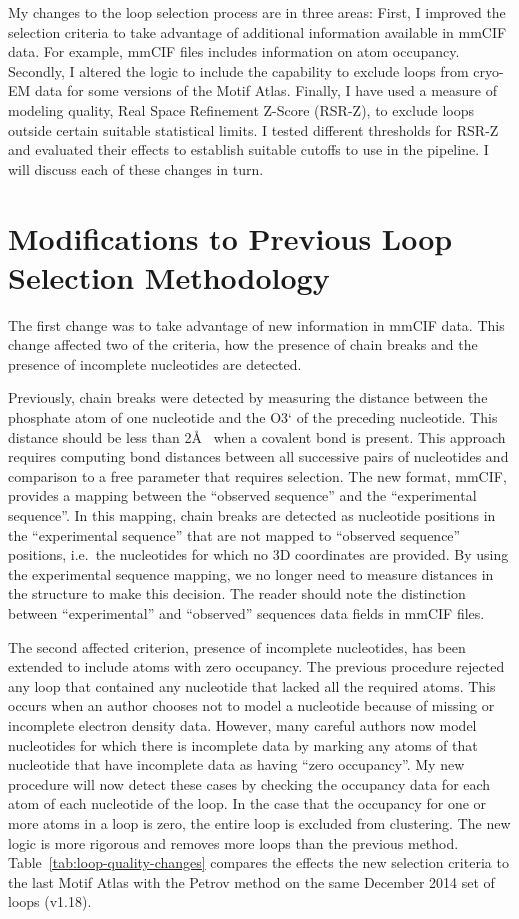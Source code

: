 My changes to the loop selection process are in three areas: First, I improved
the selection criteria to take advantage of additional information available in
mmCIF data. For example, mmCIF files includes information on atom occupancy.
Secondly, I altered the logic to include the capability to exclude loops from
cryo-EM data for some versions of the Motif Atlas. Finally, I have used a
measure of modeling quality, Real Space Refinement Z-Score (RSR-Z), to exclude
loops outside certain suitable statistical limits. I tested different thresholds for
RSR-Z and evaluated their effects to establish suitable cutoffs to use in the
pipeline. I will discuss each of these changes in turn.

\section{Modifications to Previous Loop Selection Methodology}

The first change was to take advantage of new information in mmCIF data. This
change affected two of the criteria, how the presence of chain breaks and
the presence of incomplete nucleotides are detected.

Previously, chain breaks were detected by measuring the distance between the
phosphate atom of one nucleotide and the O3` of the preceding nucleotide. This
distance should be less than 2{\AA}~\cite{Petrov2012} when a covalent bond is
present. This approach requires computing bond distances between all successive
pairs of nucleotides and comparison to a free parameter that requires selection.
The new format, mmCIF, provides a mapping between the ``observed sequence'' and
the ``experimental sequence''. In this mapping, chain breaks are detected as
nucleotide positions in the ``experimental sequence'' that are not mapped to
``observed sequence'' positions, i.e.\ the nucleotides for which no 3D coordinates are
provided. By using the experimental sequence mapping, we no longer need to
measure distances in the structure to make this decision. The reader should note
the distinction between ``experimental'' and ``observed'' sequences data fields
in mmCIF files.

The second affected criterion, presence of incomplete nucleotides, has been
extended to include atoms with zero occupancy. The previous procedure rejected
any loop that contained any nucleotide that lacked all the required atoms. This
occurs when an author chooses not to model a nucleotide because of missing  or
incomplete electron density data. However, many careful authors now model
nucleotides for which there is incomplete data by marking any atoms of that
nucleotide that have incomplete data as having ``zero occupancy''. My new
procedure will now detect these cases by checking the occupancy data for each
atom of each nucleotide of the loop. In the case that the occupancy for one or
more atoms in a loop is zero, the entire loop is excluded from clustering. The
new logic is more rigorous and removes more loops than the previous method.
Table~\ref{tab:loop-quality-changes} compares the effects the new selection
criteria to the last Motif Atlas with the Petrov method on the same December 2014
set of loops (v1.18).

